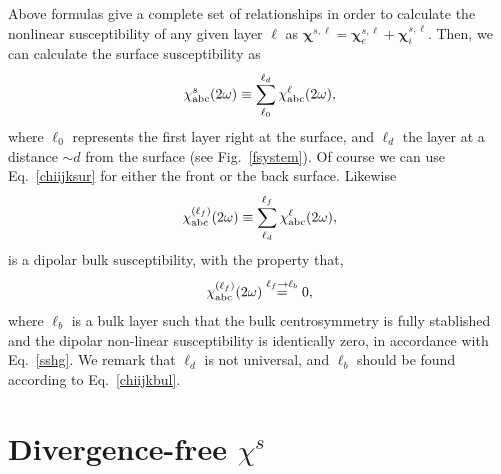 \documentclass[floatfix,prb,aps,superscriptaddress,11pt,preprint]{revtex4}
\begin{document}
Above formulas give a complete set of relationships in order to calculate
the nonlinear susceptibility of any given layer $\ell$ as
$\boldsymbol{\chi}^{s,\ell}=\boldsymbol{\chi}_e^{s,\ell}+\boldsymbol{\chi}_i^{s,\ell}$. 
Then,
we can calculate the surface
susceptibility as 
\begin{equation}\label{chiijksur}
\chi_{\mathrm{a}\mathrm{b}\mathrm{c}}^s(2\omega)\equiv \sum_{\ell_0}^{\ell_d}\chi_{\mathrm{a}\mathrm{b}\mathrm{c}}^{\ell}(2\omega),
\end{equation}
where $\ell_0$ represents the first  layer right at the surface, and $\ell_d$ the
layer at a distance $\sim d$ from the surface (see
Fig.~\ref{fsystem}). Of course we can use Eq.~\eqref{chiijksur} for
either the front or the back surface.
Likewise
\begin{equation}\label{chiijklf}
\chi_{\mathrm{a}\mathrm{b}\mathrm{c}}^{(\ell_f)}(2\omega)\equiv \sum_{\ell_d}^{\ell_f}\chi_{\mathrm{a}\mathrm{b}\mathrm{c}}^{\ell}(2\omega),
\end{equation}
is a dipolar bulk susceptibility, with the property that,
\begin{equation}\label{chiijkbul}
\chi_{\mathrm{a}\mathrm{b}\mathrm{c}}^{(\ell_f)}(2\omega)\stackrel{\ell_f \to \ell_b}{=} 0,
\end{equation}
where $\ell_b$ is a bulk layer such that the bulk centrosymmetry is
fully stablished and the dipolar non-linear susceptibility is
identically zero, in accordance with Eq.~\eqref{sshg}. We remark that 
$\ell_d$  is
not universal, and $\ell_b$ should be found according to Eq.~\eqref{chiijkbul}. 

\section{Divergence-free $\chi^s$}
\end{document}
